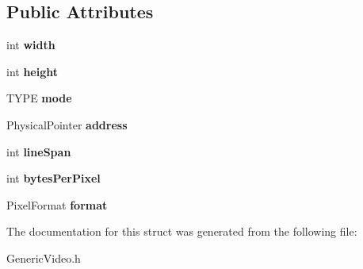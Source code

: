 \subsection*{Public Attributes}
\begin{DoxyCompactItemize}
\item 
\mbox{\label{struct_generic_video_1_1_f_r_a_m_e_b_u_f_f_e_r_a954cd6b182ab1df0758616917ddcf064}} 
int {\bfseries width}
\item 
\mbox{\label{struct_generic_video_1_1_f_r_a_m_e_b_u_f_f_e_r_a527a99a438df1a46909f18ffdde7ffcb}} 
int {\bfseries height}
\item 
\mbox{\label{struct_generic_video_1_1_f_r_a_m_e_b_u_f_f_e_r_a3357709abff25112e53ca4bdcb43cf00}} 
T\+Y\+PE {\bfseries mode}
\item 
\mbox{\label{struct_generic_video_1_1_f_r_a_m_e_b_u_f_f_e_r_a01fc057b3adee75af9528dd1953ee4ad}} 
Physical\+Pointer {\bfseries address}
\item 
\mbox{\label{struct_generic_video_1_1_f_r_a_m_e_b_u_f_f_e_r_af15f6a049da78198065915d9ba9e99a4}} 
int {\bfseries line\+Span}
\item 
\mbox{\label{struct_generic_video_1_1_f_r_a_m_e_b_u_f_f_e_r_a78459a43694cb0d452c5878768c47318}} 
int {\bfseries bytes\+Per\+Pixel}
\item 
\mbox{\label{struct_generic_video_1_1_f_r_a_m_e_b_u_f_f_e_r_a06d74f3ca675e5bad576701a220deaee}} 
Pixel\+Format {\bfseries format}
\end{DoxyCompactItemize}


The documentation for this struct was generated from the following file\+:\begin{DoxyCompactItemize}
\item 
Generic\+Video.\+h\end{DoxyCompactItemize}
